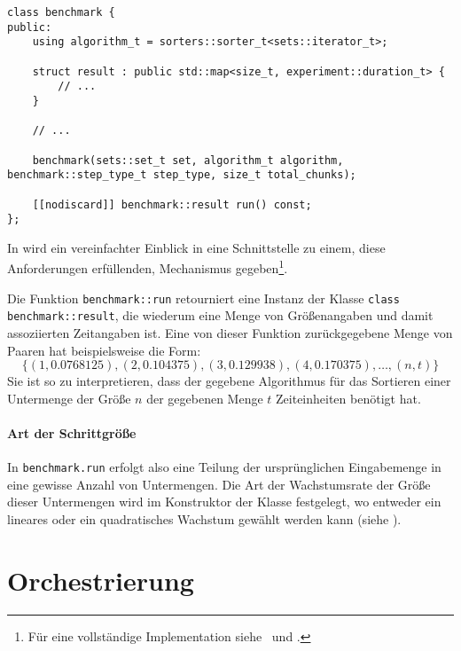 \begin{lstlisting}[caption={Klasse zur Approximation einer Funktion der Laufzeit eines Algorithmus in Abhängigkeit der Eingabegröße.}, label=lst:simple-benchmark]
class benchmark {
public:
	using algorithm_t = sorters::sorter_t<sets::iterator_t>;

	struct result : public std::map<size_t, experiment::duration_t> {
	    // ...
	}

	// ...

	benchmark(sets::set_t set, algorithm_t algorithm, benchmark::step_type_t step_type, size_t total_chunks);

	[[nodiscard]] benchmark::result run() const;
};
\end{lstlisting}
\noindent
In  wird ein vereinfachter Einblick in eine Schnittstelle zu einem, diese Anforderungen erfüllenden, Mechanismus gegeben\footnote{Für eine vollständige Implementation siehe \crBenchmark~und \crBenchmarkImpl.}.

Die Funktion \lstinline{benchmark::run} retourniert eine Instanz der Klasse \lstinline{class benchmark::result}, die wiederum eine Menge von Größenangaben und damit assoziierten Zeitangaben ist. Eine von dieser Funktion zurückgegebene Menge von Paaren hat beispielsweise die Form:
\begin{equation*}
	\{
		(1, 0.0768125),
		(2, 0.104375),
		(3, 0.129938),
		(4, 0.170375),
		\ldots,
		(n, t)
	\}
\end{equation*}
Sie ist so zu interpretieren, dass der gegebene Algorithmus für das Sortieren einer Untermenge der Größe $n$ der gegebenen Menge $t$ Zeiteinheiten benötigt hat.

\paragraph{Art der Schrittgröße}

In \lstinline{benchmark.run} erfolgt also eine Teilung der ursprünglichen Eingabemenge in eine gewisse Anzahl von Untermengen. Die Art der Wachstumsrate der Größe dieser Untermengen wird im Konstruktor der Klasse festgelegt, wo entweder ein lineares oder ein quadratisches Wachstum gewählt werden kann (siehe ).



\section{Orchestrierung}
\label{sec:runtime-orchestration}

